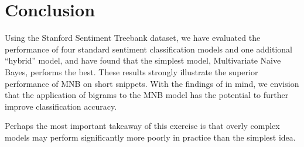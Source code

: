 \documentclass[11pt]{article}
\begin{document}
\section{Conclusion}
Using the Stanford Sentiment Treebank dataset, we have evaluated the performance of four standard sentiment classification models and one additional ``hybrid'' model, and have found that the simplest model, Multivariate Naive Bayes, performs the best. These results strongly illustrate the superior performance of MNB on short snippets. With the findings of \citeauthor{wang2012baselines} in mind, we envision that the application of bigrams to the MNB model has the potential to further improve classification accuracy.

Perhaps the most important takeaway of this exercise is that overly complex models may perform significantly more poorly in practice than the simplest idea.  



\nocite{*}

\end{document}
